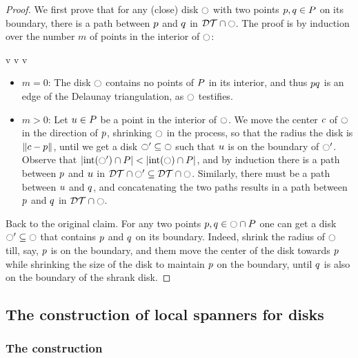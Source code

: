 \documentclass[12pt]{article}%
\begin{document}
\begin{proof}
    We first prove that for any (close) disk $\ocircle$ with two points
    $p,q\in P$ on its boundary, there is a path between $p$
    and $q$ in $\mathcal{DT} \cap {\ocircle}$.  The proof is by induction
    over the number $m$ of points in the interior of $\ocircle$:

    v v v
    
    \begin{itemize}
        \item{} $m=0$: The disk $\ocircle$ contains no points of $P$ in
        its interior, and thus $p q$ is an edge of the Delaunay
        triangulation, as $\ocircle$ testifies.

        \item $m >0$: Let $u\in P$ be a point in the interior of
        $\ocircle$. We move the center $c$ of $\ocircle$ in the direction
        of $p$, shrinking $\ocircle$ in the process, so that the radius
        the disk is $\left\| c - p \right\|$, until we get a disk
        $\ocircle' \subseteq \ocircle$ such that $u$ is on the boundary of
        $\ocircle'$. Observe that
        $|\interiorX{\disk'} \cap \PS| < |\interiorX{\disk} \cap
        \PS|$, and by induction there is a path between $p$ and
        $u$ in
        $\mathcal{DT} \cap {\ocircle'} \subseteq
        \mathcal{DT} \cap {\ocircle}$. Similarly, there must be a path
        between $u$ and $q$, and concatenating the two paths
        results in a path between $p$ and $q$ in
        $\mathcal{DT} \cap {\ocircle}$.
    \end{itemize}
    \medskip%
    \noindent
    Back to the original claim.  For any two points
    $p,q \in \ocircle \cap P$ one can get a disk
    $\ocircle' \subseteq \ocircle$ that contains $p$ and $q$ on its
    boundary.  Indeed, shrink the radius of $\ocircle$ till, say, $p$
    is on the boundary, and them move the center of the disk towards
    $p$ while shrinking the size of the disk to maintain $p$ on
    the boundary, until $q$ is also on the boundary of the shrank
    disk.
\end{proof}


\subsection{The construction of local spanners for disks}

\subsubsection{The construction}
\end{document}
